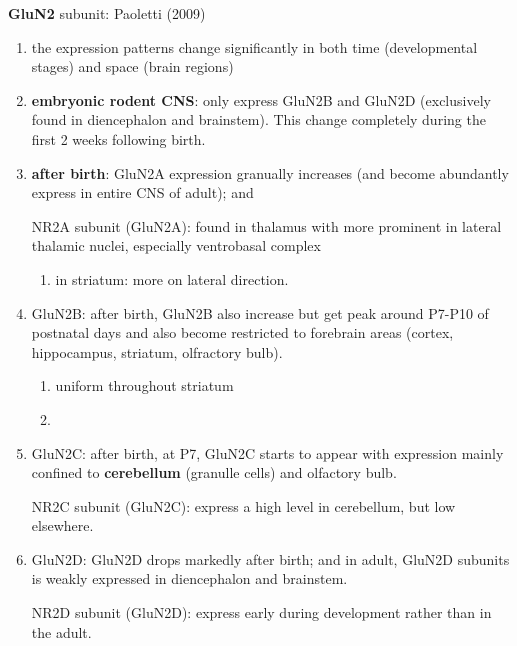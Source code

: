 {\bf GluN2} subunit: Paoletti (2009)
\begin{enumerate}
  \item the expression patterns change significantly in both time
  (developmental stages) and space (brain regions)
  
  \item {\bf embryonic rodent CNS}: only express GluN2B
  and GluN2D (exclusively found in
  diencephalon and brainstem). 
  This change completely during the first 2 weeks following birth.
  
  \item {\bf after birth}: GluN2A expression granually increases (and become
  abundantly express in entire CNS of adult); and
   
  NR2A subunit (GluN2A): found in thalamus with more prominent in lateral
  thalamic nuclei, especially ventrobasal complex
  \begin{enumerate}
    \item in striatum: more on lateral direction.
  \end{enumerate}
  
  \item GluN2B: after birth, GluN2B also increase but get peak around P7-P10 of
  postnatal days and also become restricted to forebrain areas (cortex,
  hippocampus, striatum, olfractory bulb).
  \begin{enumerate}
    \item uniform throughout striatum
    
    \item 
  \end{enumerate}
   
  \item GluN2C: after birth, at P7, GluN2C starts to appear with expression
  mainly confined to {\bf cerebellum} (granulle cells) and olfactory bulb. 
    
  NR2C subunit (GluN2C): express a high level in cerebellum, but low
  elsewhere.
  
  \item GluN2D: GluN2D drops markedly after birth; and in adult, GluN2D subunits
  is weakly expressed in diencephalon and brainstem.
   
  NR2D subunit (GluN2D): express early during development rather than in
  the adult.
    
\end{enumerate}


